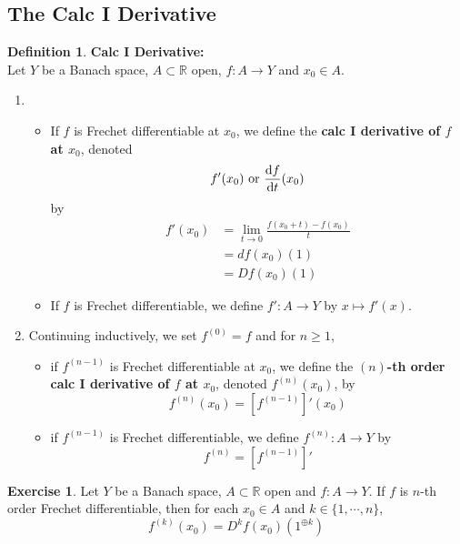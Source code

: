 \documentclass[12pt]{amsart}
\theoremstyle{definition}
\newtheorem{defn}[definition]{Definition}
\newtheorem{ex}[definition]{Exercise}
\newcommand{\R}{\mathbb{R}}
\newcommand{\lex}[1]{\label{ex:#1}}
\newcommand{\ld}[1]{\label{defn:#1}}
\begin{document}
	\subsection{The Calc I Derivative}
	\begin{defn} \ld{}\textbf{Calc I Derivative:}\\
	Let $Y$ be a Banach space, $A \subset \R$ open, $f:A \rightarrow Y$ and $x_0 \in A$. 
	\begin{enumerate}
	\item 
	\begin{itemize}
	\item If $f$ is Frechet differentiable at $x_0$, we define the \textbf{calc I derivative of $f$ at $x_0$}, denoted $$f'(x_0) \text{ or } \dv{f}{t}{(x_0)}$$ by
	\begin{align*}
	f'(x_0) 
	&= \lim_{t \rightarrow 0} \frac{f(x_0 + t) - f(x_0)}{t} \\
	&= df(x_0)(1) \\
	&= Df(x_0)(1)
	\end{align*}
	\item If $f$ is Frechet differentiable, we define $f':A \rightarrow Y$ by $x \mapsto f'(x)$. 
	\end{itemize}
	\item Continuing inductively, we set $f^{(0)} = f$ and for $n \geq 1$,
	\begin{itemize}
	\item  if $f^{(n-1)}$ is Frechet differentiable at $x_0$, we define the \textbf{$(n)$-th order calc I derivative of $f$ at $x_0$}, denoted $f^{(n)}(x_0)$, by $$f^{(n)}(x_0) = [f^{(n-1)}]'(x_0)$$ 
	\item if $f^{(n-1)}$ is Frechet differentiable, we define $f^{(n)}:A \rightarrow Y$ by $$f^{(n)} = [f^{(n - 1)}]'$$ 
	\end{itemize}
	\end{enumerate}
	\end{defn}	
	
	\begin{ex} \lex{}
	Let $Y$ be a Banach space, $A \subset \R$ open and $f:A \rightarrow Y$. If $f$ is $n$-th order Frechet differentiable, then for each $x_0 \in A$ and $k \in \{1, \cdots, n\}$, $$f^{(k)}(x_0) = D^kf(x_0)(1^{\oplus k})$$
	\end{ex}
	
\end{document}
